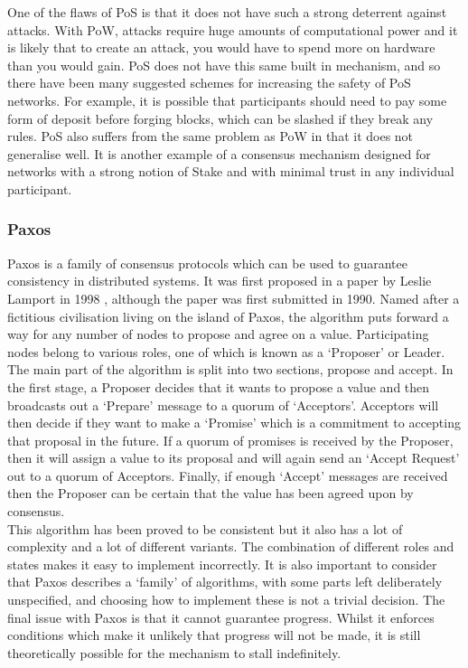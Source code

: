 \documentclass[12pt,a4paper,twoside,openright]{report}
\begin{document}
	One of the flaws of PoS is that it does not have such a strong deterrent against attacks.
	With PoW, attacks require huge amounts of computational power and it is likely that to create an attack, you would have to spend more on hardware than you would gain. 
	PoS does not have this same built in mechanism, and so there have been many suggested schemes for increasing the safety of PoS networks.
	For example, it is possible that participants should need to pay some form of deposit before forging blocks, which can be slashed if they break any rules. 
	PoS also suffers from the same problem as PoW in that it does not generalise well. 
	It is another example of a consensus mechanism designed for networks with a strong notion of Stake and with minimal trust in any individual participant.

	\subsubsection*{Paxos}
	Paxos is a family of consensus protocols which can be used to guarantee consistency in distributed systems. 
	It was first proposed in a paper by Leslie Lamport in 1998 \cite{Paxos}, although the paper was first submitted in 1990.
	Named after a fictitious civilisation living on the island of Paxos, the algorithm puts forward a way for any number of nodes to propose and agree on a value.
	Participating nodes belong to various roles, one of which is known as a `Proposer' or Leader.\\

	The main part of the algorithm is split into two sections, propose and accept.
	In the first stage, a Proposer decides that it wants to propose a value and then broadcasts out a `Prepare' message to a quorum of `Acceptors'.
	Acceptors will then decide if they want to make a `Promise' which is a commitment to accepting that proposal in the future. 
	If a quorum of promises is received by the Proposer, then it will assign a value to its proposal and will again send an `Accept Request' out to a quorum of Acceptors.
	Finally, if enough `Accept' messages are received then the Proposer can be certain that the value has been agreed upon by consensus.\\

	This algorithm has been proved to be consistent but it also has a lot of complexity and a lot of different variants. 
	The combination of different roles and states makes it easy to implement incorrectly.
	It is also important to consider that Paxos describes a `family' of algorithms, with some parts left deliberately unspecified, and choosing how to implement these is not a trivial decision.
	The final issue with Paxos is that it cannot guarantee progress.
	Whilst it enforces conditions which make it unlikely that progress will not be made, it is still theoretically possible for the mechanism to stall indefinitely.
\end{document}
